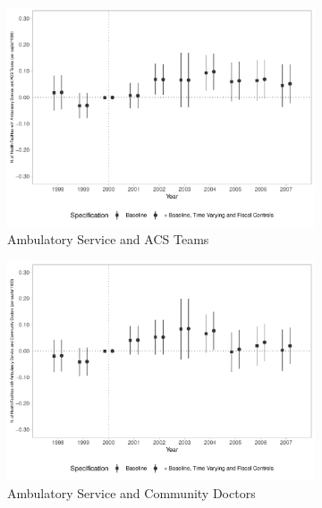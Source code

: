 \begin{figure}[h!]
\begin{center}
\begin{subfigure}{0.32\textwidth}
    \end{subfigure}
    \begin{subfigure}{0.32\textwidth}
        \centering
        \caption{\scriptsize Ambulatory Service and ACS Teams}\label{fig:13c}
        \includegraphics[width=\textwidth]{plots/sia_ncnes_acs_pcapita_dist_ec29_baseline_dist_ec29_baseline_13.pdf}
    \end{subfigure}
        \begin{subfigure}{0.32\textwidth}
        \caption{\scriptsize Ambulatory Service and Community Doctors}\label{fig:13d}
        \centering
        \includegraphics[width=\textwidth]{plots/sia_ncnes_medcom_pcapita_dist_ec29_baseline_dist_ec29_baseline_13.pdf}
    \end{subfigure}
    \begin{subfigure}{0.32\textwidth}

\end{subfigure}
\end{center}
\end{figure}
